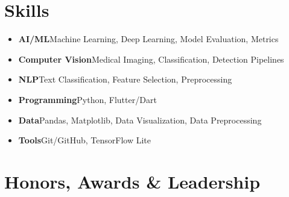 \documentclass[a4paper,11pt]{article}
\newcommand{\resumeItem}[2]{
  \item{
    \textbf{#1}{\hspace{0.5mm}#2 \vspace{-0.5mm}}
  }
}
\newcommand{\resumeSubItem}[2]{\resumeItem{#1}{#2}\vspace{-4pt}}
\newcommand{\resumeHeadingSkillStart}{\begin{itemize}[leftmargin=*,itemsep=1.7mm, rightmargin=2ex]}
\newcommand{\resumeHeadingSkillEnd}{\end{itemize}\vspace{-2mm}}
\begin{document}


\section{\textbf{Skills}}
\resumeHeadingSkillStart
  \resumeSubItem{AI/ML}{Machine Learning, Deep Learning, Model Evaluation, Metrics}
  \resumeSubItem{Computer Vision}{Medical Imaging, Classification, Detection Pipelines}
  \resumeSubItem{NLP}{Text Classification, Feature Selection, Preprocessing}
  \resumeSubItem{Programming}{Python, Flutter/Dart}
  \resumeSubItem{Data}{Pandas, Matplotlib, Data Visualization, Data Preprocessing}
  \resumeSubItem{Tools}{Git/GitHub, TensorFlow Lite}
\resumeHeadingSkillEnd


\section{\textbf{Honors, Awards \& Leadership}}
\end{document}
